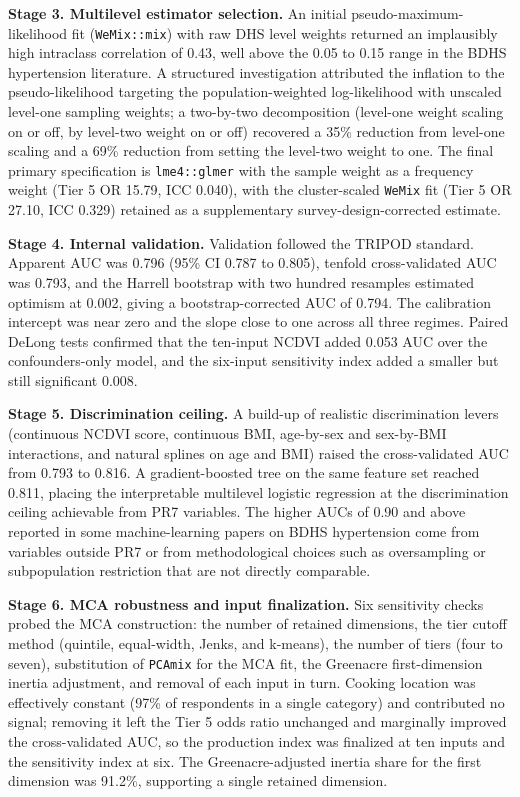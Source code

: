 \documentclass[
  12pt,
  a4paper]{article}
\begin{document}
\textbf{Stage 3. Multilevel estimator selection.} An initial pseudo-maximum-likelihood fit (\texttt{WeMix::mix}) with raw DHS level weights returned an implausibly high intraclass correlation of 0.43, well above the 0.05 to 0.15 range in the BDHS hypertension literature. A structured investigation attributed the inflation to the pseudo-likelihood targeting the population-weighted log-likelihood with unscaled level-one sampling weights; a two-by-two decomposition (level-one weight scaling on or off, by level-two weight on or off) recovered a 35\% reduction from level-one scaling and a 69\% reduction from setting the level-two weight to one. The final primary specification is \texttt{lme4::glmer} with the sample weight as a frequency weight (Tier 5 OR 15.79, ICC 0.040), with the cluster-scaled \texttt{WeMix} fit (Tier 5 OR 27.10, ICC 0.329) retained as a supplementary survey-design-corrected estimate.

\textbf{Stage 4. Internal validation.} Validation followed the TRIPOD standard. Apparent AUC was 0.796 (95\% CI 0.787 to 0.805), tenfold cross-validated AUC was 0.793, and the Harrell bootstrap with two hundred resamples estimated optimism at 0.002, giving a bootstrap-corrected AUC of 0.794. The calibration intercept was near zero and the slope close to one across all three regimes. Paired DeLong tests confirmed that the ten-input NCDVI added 0.053 AUC over the confounders-only model, and the six-input sensitivity index added a smaller but still significant 0.008.

\textbf{Stage 5. Discrimination ceiling.} A build-up of realistic discrimination levers (continuous NCDVI score, continuous BMI, age-by-sex and sex-by-BMI interactions, and natural splines on age and BMI) raised the cross-validated AUC from 0.793 to 0.816. A gradient-boosted tree on the same feature set reached 0.811, placing the interpretable multilevel logistic regression at the discrimination ceiling achievable from PR7 variables. The higher AUCs of 0.90 and above reported in some machine-learning papers on BDHS hypertension come from variables outside PR7 or from methodological choices such as oversampling or subpopulation restriction that are not directly comparable.

\textbf{Stage 6. MCA robustness and input finalization.} Six sensitivity checks probed the MCA construction: the number of retained dimensions, the tier cutoff method (quintile, equal-width, Jenks, and k-means), the number of tiers (four to seven), substitution of \texttt{PCAmix} for the MCA fit, the Greenacre first-dimension inertia adjustment, and removal of each input in turn. Cooking location was effectively constant (97\% of respondents in a single category) and contributed no signal; removing it left the Tier 5 odds ratio unchanged and marginally improved the cross-validated AUC, so the production index was finalized at ten inputs and the sensitivity index at six. The Greenacre-adjusted inertia share for the first dimension was 91.2\%, supporting a single retained dimension.
\end{document}
